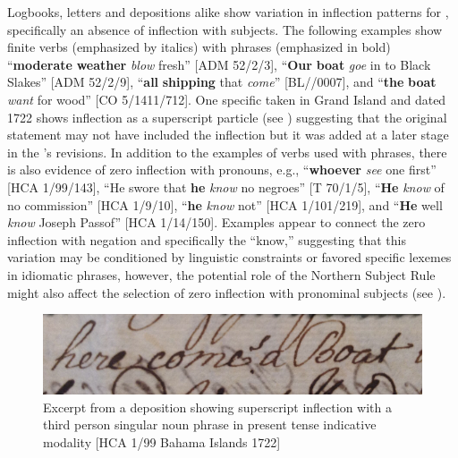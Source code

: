 Logbooks, letters and depositions alike show variation in inflection patterns for  , specifically an absence of inflection with  subjects. The following examples show  finite verbs (emphasized by italics) with   phrases (emphasized in bold) “\textbf{moderate} \textbf{weather} \textit{blow} fresh” [ADM 52/2/3], “\textbf{Our} \textbf{boat} \textit{goe} in to Black Slakes” [ADM 52/2/9], “\textbf{all} \textbf{shipping} that \textit{come}” [BL/\citealt{Egerton2395}/0007], and “\textbf{the} \textbf{boat} \textit{want} for wood” [CO 5/1411/712]. One specific  taken in Grand  Island and dated 1722 shows inflection as a superscript particle (see ) suggesting that the original statement may not have included the inflection but it was added at a later stage in the ’s revisions. In addition to the examples of verbs used with   phrases, there is also evidence of zero inflection with  pronouns, e.g., “\textbf{whoever} \textit{see} one first” [HCA 1/99/143], “He swore that \textbf{he} \textit{know} no negroes” [T 70/1/5], “\textbf{He} \textit{know} of no commission” [HCA 1/9/10], “\textbf{he} \textit{know} not” [HCA 1/101/219], and “\textbf{He} well \textit{know} Joseph Passof” [HCA 1/14/150]. Examples appear to connect the zero inflection with negation and specifically the  “know,” suggesting that this variation may be conditioned by linguistic constraints or favored specific lexemes in idiomatic phrases, however, the potential role of the Northern Subject Rule might also affect the selection of zero inflection with  pronominal subjects (see  \citealt{deHaas2006}). 

 
\begin{figure} 
\includegraphics[width=\textwidth]{figures/delgado-img16.png}

\caption{\label{fig:key:6.2} Excerpt from a deposition showing superscript inflection with a third person singular noun phrase in present tense indicative modality [HCA 1/99 Bahama {Islands 1722}]}
\end{figure}



